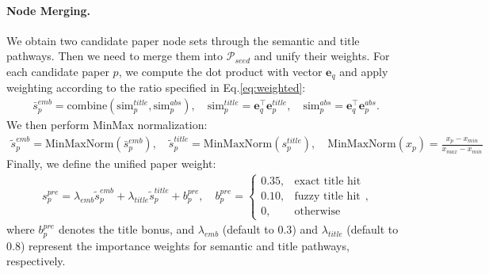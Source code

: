 \paragraph{Node Merging.}
We obtain two candidate paper node sets through the semantic and title pathways.
Then we need to merge them into $\mathcal{P}_{seed}$ and unify their weights.
For each candidate paper $p$, we compute the dot product with vector $\mathbf{e}_q$ and apply weighting according to the ratio specified in Eq.\ref{eq:weighted}:
\begin{align}
    \bar{s}_p^{emb} = \text{combine}(\text{sim}_p^{title},\text{sim}_p^{abs}),\quad\text{sim}_p^{title} = \mathbf{e}_q^\top \mathbf{e}_p^{title},\quad\text{sim}_p^{abs} = \mathbf{e}_q^\top \mathbf{e}_p^{abs}.
\end{align}
We then perform MinMax normalization:
\begin{align}
    \widetilde{s}_p^{emb} = \text{MinMaxNorm}(\bar{s}_p^{emb}),\quad\widetilde{s}_p^{title} = \text{MinMaxNorm}(s_p^{title}),\quad\text{MinMaxNorm}(x_p) = \frac{x_p - x_{min}}{x_{max} - x_{min}}
\end{align}
Finally, we define the unified paper weight:
\begin{align}
    \label{eq:pre_graph}s_p^{pre}=\lambda_{emb}\widetilde{s}_p^{emb}+\lambda_{title}\widetilde{s}_p^{title}+b_p^{pre},\quad b_p^{pre} =
\begin{cases}
0.35, & \text{exact title hit} \\
0.10, & \text{fuzzy title hit} \\
0, & \text{otherwise}
\end{cases},
\end{align}
where $b_p^{pre}$ denotes the title bonus, and $\lambda_{emb}$ (default to $0.3$) and $\lambda_{title}$ (default to $0.8$) represent the importance weights for semantic and title pathways, respectively.

